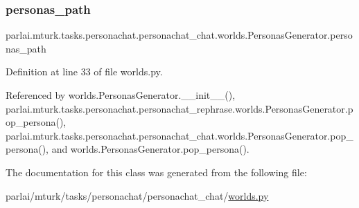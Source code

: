 \mbox{\label{classparlai_1_1mturk_1_1tasks_1_1personachat_1_1personachat__chat_1_1worlds_1_1PersonasGenerator_a8fca2a7dc0bf0414a2e46024de75882b}} 
\subsubsection{\texorpdfstring{personas\+\_\+path}{personas\_path}}
{\footnotesize\ttfamily parlai.\+mturk.\+tasks.\+personachat.\+personachat\+\_\+chat.\+worlds.\+Personas\+Generator.\+personas\+\_\+path}



Definition at line 33 of file worlds.\+py.



Referenced by worlds.\+Personas\+Generator.\+\_\+\+\_\+init\+\_\+\+\_\+(), parlai.\+mturk.\+tasks.\+personachat.\+personachat\+\_\+rephrase.\+worlds.\+Personas\+Generator.\+pop\+\_\+persona(), parlai.\+mturk.\+tasks.\+personachat.\+personachat\+\_\+chat.\+worlds.\+Personas\+Generator.\+pop\+\_\+persona(), and worlds.\+Personas\+Generator.\+pop\+\_\+persona().



The documentation for this class was generated from the following file\+:\begin{DoxyCompactItemize}
\item 
parlai/mturk/tasks/personachat/personachat\+\_\+chat/\hyperlink{parlai_2mturk_2tasks_2personachat_2personachat__chat_2worlds_8py}{worlds.\+py}\end{DoxyCompactItemize}
